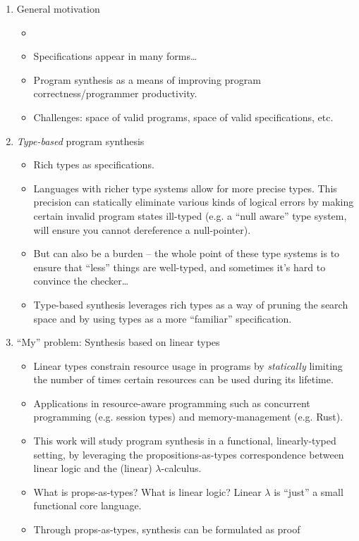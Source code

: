 \documentclass{llncs}
\begin{document}
\begin{enumerate}
\item General motivation
  \begin{itemize}
\item 
\item Specifications appear in many forms\dots
\item Program synthesis as a means of improving program
  correctness/programmer productivity.
\item Challenges: space of valid programs, space of valid
  specifications,  etc.
\end{itemize}
\item \emph{Type-based} program synthesis
  \begin{itemize}
 \item Rich types as specifications.
\item Languages with richer type systems allow for more precise
  types. This precision can statically eliminate various kinds of
  logical errors by making certain invalid program states ill-typed
  (e.g. a ``null aware'' type system, will ensure you cannot
  dereference a null-pointer).
\item But can also be a burden -- the whole point of these type
  systems is to ensure that ``less'' things are well-typed, and
  sometimes it's hard to convince the checker\dots
\item Type-based synthesis leverages rich types as a way of pruning
  the search space and by using types as a more ``familiar''
  specification.
\end{itemize}
\item ``My'' problem: Synthesis based on linear types
  \begin{itemize}
  \item Linear types constrain resource usage in programs by \emph{statically} limiting
    the number of times certain resources can be used during its
    lifetime.
  \item Applications in resource-aware programming such as concurrent
    programming (e.g. session types) and memory-management
    (e.g. Rust).
  \item This work will study program synthesis in a functional,
    linearly-typed setting, by leveraging the propositions-as-types
    correspondence between linear logic and the (linear)
    $\lambda$-calculus.
  \item What is props-as-types? What is linear logic? Linear $\lambda$
    is ``just'' a small functional core language.
  \item Through props-as-types, synthesis can be formulated as proof

\end{itemize}
\end{enumerate}
\end{document}
